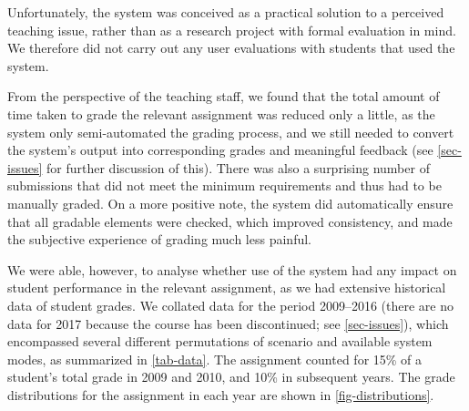 \documentclass[sigconf, authordraft, capitalise]{acmart}
\begin{document}
Unfortunately, the system was conceived as a practical solution to a perceived teaching issue, rather than as a research project with formal evaluation in mind. We therefore did not carry out any user evaluations with students that used the system.

From the perspective of the teaching staff, we found that the total amount of time taken to grade the relevant assignment was reduced only a little, as the system only semi-automated the grading process, and we still needed to convert the system's output into corresponding grades and meaningful feedback (see \cref{sec-issues} for further discussion of this). There was also a surprising number of submissions that did not meet the minimum requirements and thus had to be manually graded. On a more positive note, the system did automatically ensure that all gradable elements were checked, which improved consistency, and made the subjective experience of grading much less painful.

We were able, however, to analyse whether use of the system had any impact on student performance in the relevant assignment, as we had extensive historical data of student grades. We collated data for the period 2009--2016 (there are no data for 2017 because the course has been discontinued; see \cref{sec-issues}), which encompassed several different permutations of scenario and available system modes, as summarized in \cref{tab-data}. The assignment counted for 15\% of a student's total grade in 2009 and 2010, and 10\% in subsequent years. The grade distributions for the assignment in each year are shown in \cref{fig-distributions}.
\end{document}
